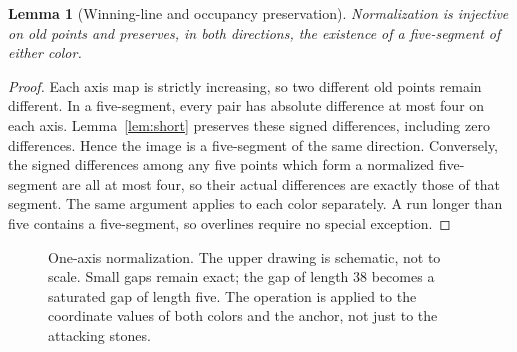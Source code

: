 \documentclass[11pt]{article}
\newtheorem{lemma}[theorem]{Lemma}
\theoremstyle{definition}
\theoremstyle{remark}
\begin{document}
\begin{lemma}[Winning-line and occupancy preservation]
\label{lem:five}
Normalization is injective on old points and preserves, in both directions,
the existence of a five-segment of either color.
\end{lemma}
\begin{proof}
Each axis map is strictly increasing, so two different old points remain
different. In a five-segment, every pair has absolute difference at most
four on each axis. Lemma~\ref{lem:short} preserves these signed differences,
including zero differences. Hence the image is a five-segment of the same
direction. Conversely, the signed differences among any five points which
form a normalized five-segment are all at most four, so their actual
differences are exactly those of that segment. The same argument applies
to each color separately. A run longer than five contains a five-segment,
so overlines require no special exception.
\end{proof}

\begin{figure}[ht]
\centering
{}
\caption{One-axis normalization. The upper drawing is schematic, not to scale.
Small gaps remain exact; the gap of length 38 becomes a saturated gap of
length five. The operation is applied to the coordinate values of both
colors and the anchor, not just to the attacking stones.}
\label{fig:gap}
\end{figure}
\end{document}

